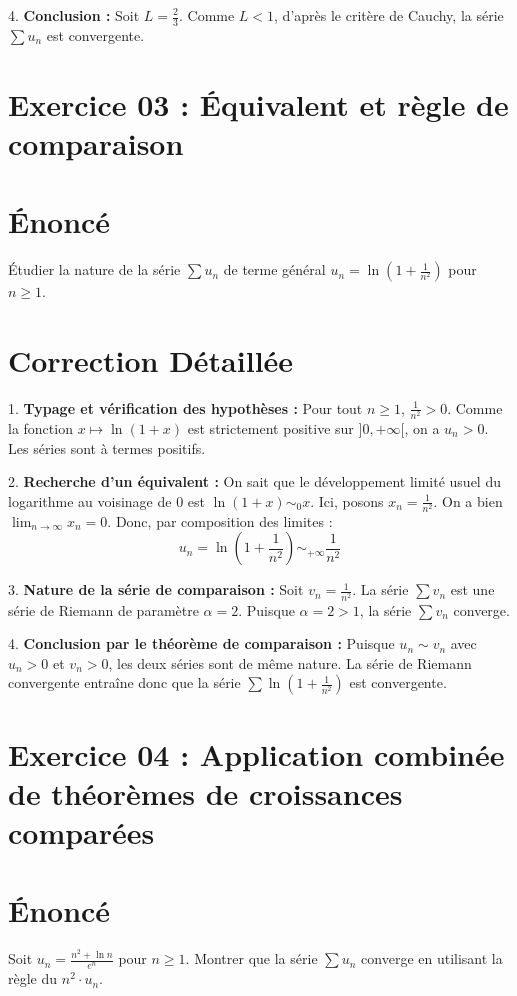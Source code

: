 \documentclass[12pt, a4paper]{article}
\begin{document}
4. \textbf{Conclusion :}
   Soit $L = \frac{2}{3}$. Comme $L < 1$, d'après le critère de Cauchy, la série $\sum u_n$ est convergente.


\section*{Exercice 03 : Équivalent et règle de comparaison}

\section{Énoncé}
Étudier la nature de la série $\sum u_n$ de terme général $u_n = \ln\left(1 + \frac{1}{n^2}\right)$ pour $n \ge 1$.

\section{Correction Détaillée}
1. \textbf{Typage et vérification des hypothèses :}
   Pour tout $n \ge 1$, $\frac{1}{n^2} > 0$. Comme la fonction $x \mapsto \ln(1+x)$ est strictement positive sur $]0, +\infty[$, on a $u_n > 0$.
   Les séries sont à termes positifs.

2. \textbf{Recherche d'un équivalent :}
   On sait que le développement limité usuel du logarithme au voisinage de $0$ est $\ln(1+x) \sim_0 x$.
   Ici, posons $x_n = \frac{1}{n^2}$. On a bien $\lim_{n \to \infty} x_n = 0$.
   Donc, par composition des limites :
   $$u_n = \ln\left(1 + \frac{1}{n^2}\right) \sim_{+\infty} \frac{1}{n^2}$$

3. \textbf{Nature de la série de comparaison :}
   Soit $v_n = \frac{1}{n^2}$.
   La série $\sum v_n$ est une série de Riemann de paramètre $\alpha = 2$.
   Puisque $\alpha = 2 > 1$, la série $\sum v_n$ converge.

4. \textbf{Conclusion par le théorème de comparaison :}
   Puisque $u_n \sim v_n$ avec $u_n > 0$ et $v_n > 0$, les deux séries sont de même nature.
   La série de Riemann convergente entraîne donc que la série $\sum \ln\left(1 + \frac{1}{n^2}\right)$ est convergente.


\section*{Exercice 04 : Application combinée de théorèmes de croissances comparées}

\section{Énoncé}
Soit $u_n = \frac{n^2 + \ln n}{e^n}$ pour $n \ge 1$.
Montrer que la série $\sum u_n$ converge en utilisant la règle du $n^2 \cdot u_n$.
\end{document}
